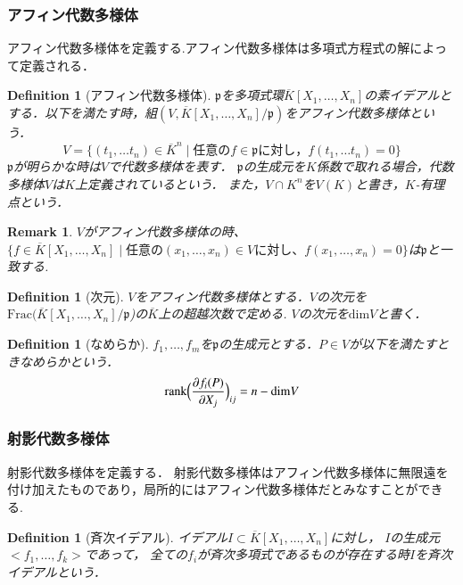 \documentclass{ujarticle}
\newtheorem{dfn}[thm]{Definition}
\newtheorem*{rem}{Remark}
\begin{document}
\subsubsection{アフィン代数多様体}
\label{subs:アフィン代数多様体}
アフィン代数多様体を定義する.アフィン代数多様体は多項式方程式の解によって定義される．
\begin{dfn}[アフィン代数多様体]
$\mathfrak{p}$を多項式環$\overline{K}[X_1,\dots,X_n]$の素イデアルとする．以下を満たす時，組$(V,\overline{K}[X_1,\dots,X_n]/\mathfrak{p})$をアフィン代数多様体という．
\begin{equation*}
  V = \{ (t_1, \dots t_n) \in {\overline{K}}^n \mid \mbox{任意の}f \in \mathfrak{p} \mbox{に対し，}f(t_1, \dots t_n)=0 \}
\end{equation*}
$\mathfrak{p}$が明らかな時は$V$で代数多様体を表す．
$\mathfrak{p}$の生成元を$K$係数で取れる場合，代数多様体$V$は$K$上定義されているという．
また，$V \cap K^n$を$V(K)$と書き，$K$-有理点という．
\end{dfn}
\begin{rem}
 $V$がアフィン代数多様体の時、$\{f \in \overline{K}[X_1,\dots,X_n] \mid
 \mbox{任意の}(x_1,\dots,x_n) \in V \mbox{に対し、}
 f(x_1,\dots,x_n)=0 \}$は$\mathfrak{p}$と一致する.
\end{rem}

\begin{dfn}[次元]
$V$をアフィン代数多様体とする．$V$の次元を
$\mathrm{Frac}(\overline{K}[X_1,\dots,X_n]/\mathfrak{p}$)の$\overline{K}$上の超越次数で定める.
$V$の次元を$\mathrm{dim}V$と書く．
\end{dfn}

\begin{dfn}[なめらか]
  $f_1,\dots,f_m$を$\mathfrak{p}$の生成元とする．$P \in V$が以下を満たすときなめらかという．
  \begin{equation*}
    \mathrm{rank}\Bigl(\frac{ \partial f_i(P)}{ \partial X_j} \Bigr)_{ij} = n - \mathrm{dim}V
  \end{equation*}
\end{dfn}

\subsubsection{射影代数多様体}
\label{subs:射影代数多様体}

射影代数多様体を定義する．
射影代数多様体はアフィン代数多様体に無限遠を付け加えたものであり，局所的にはアフィン代数多様体だとみなすことができる.
\begin{dfn}[斉次イデアル]
イデアル$I\subset \overline{K}[X_1,\dots,X_n]$に対し，
$I$の生成元$<f_1,\dots,f_k>$であって，
全ての$f_i$が斉次多項式であるものが存在する時$I$を斉次イデアルという．
\end{dfn}
\end{document}
